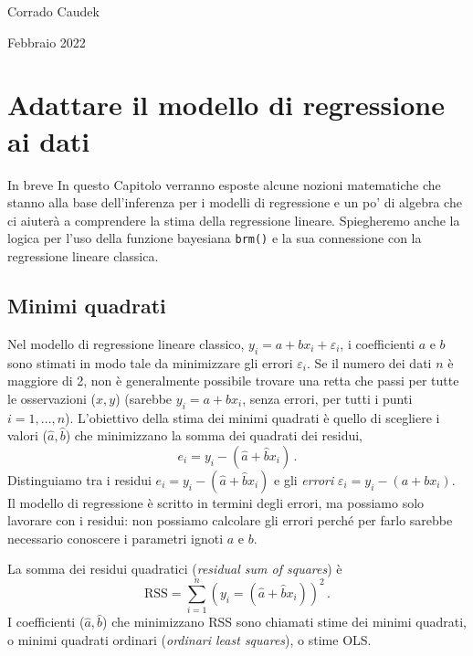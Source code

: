 \documentclass[
  10pt,
  italian,
  a4paper,
  extrafontsizes,onecolumn,openright
  ]{memoir}
\newenvironment{Summary}
  {\begin{bclogo}[logo=\bctrombone, noborder=true, couleur=lightgray!50]{In breve}\parindent0pt}
  {\end{bclogo}}
\begin{document}
\bigskip

Corrado Caudek

\bigskip

Febbraio 2022

\mainmatter

\hypertarget{regr-ml}{%
\chapter{Adattare il modello di regressione ai dati}\label{regr-ml}}

\begin{Summary}
In questo Capitolo verranno esposte alcune nozioni matematiche che
stanno alla base dell'inferenza per i modelli di regressione e un po' di
algebra che ci aiuterà a comprendere la stima della regressione lineare.
Spiegheremo anche la logica per l'uso della funzione bayesiana
\texttt{brm()} e la sua connessione con la regressione lineare classica.
\end{Summary}

\hypertarget{minimi-quadrati}{%
\section{Minimi quadrati}\label{minimi-quadrati}}

Nel modello di regressione lineare classico, \(y_i = a + b x_i + \varepsilon_i\), i coefficienti \(a\) e \(b\) sono stimati in modo tale da minimizzare gli errori \(\varepsilon_i\). Se il numero dei dati \(n\) è maggiore di 2, non è generalmente possibile trovare una retta che passi per tutte le osservazioni (\(x, y\)) (sarebbe \(y_i = a + b x_i\), senza errori, per tutti i punti \(i = 1, \dots, n\)). L'obiettivo della stima dei minimi quadrati è quello di scegliere i valori (\(\hat{a}, \hat{b}\)) che minimizzano la somma dei quadrati dei residui,
\begin{equation}
e_i = y_i − (\hat{a} + \hat{b} x_i)\,.
\end{equation}
Distinguiamo tra i residui \(e_i = y_i - (\hat{a} + \hat{b} x_i)\) e gli \emph{errori} \(\varepsilon_i = y_i − (a + b x_i)\). Il modello di regressione è scritto in termini degli errori, ma possiamo solo lavorare con i residui: non possiamo calcolare gli errori perché per farlo sarebbe necessario conoscere i parametri ignoti \(a\) e \(b\).

La somma dei residui quadratici (\emph{residual sum of squares}) è
\begin{equation}
\text{RSS} = \sum_{i=1}^n (y_i = (\hat{a} + \hat{b} x_i))^2\,.
\end{equation}
I coefficienti (\(\hat{a}, \hat{b}\)) che minimizzano RSS sono chiamati stime dei minimi quadrati, o minimi quadrati ordinari (\emph{ordinari least squares}), o stime OLS.
\end{document}
